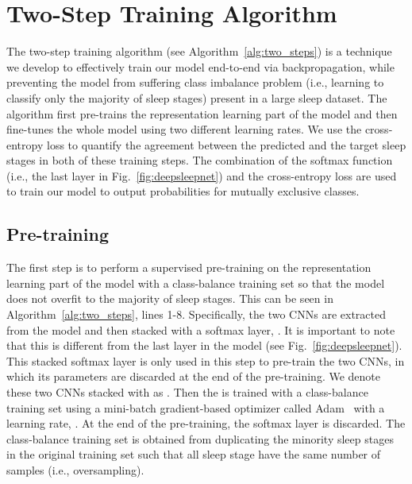 \documentclass[journal,twoside]{IEEEtran}
\begin{document}
\section{Two-Step Training Algorithm} \label{sec:two_steps}
The two-step training algorithm (see Algorithm~\ref{alg:two_steps}) is a technique we develop to effectively train our model end-to-end via backpropagation, while preventing the model from suffering class imbalance problem (i.e., learning to classify only the majority of sleep stages) present in a large sleep dataset. The algorithm first pre-trains the representation learning part of the model and then fine-tunes the whole model using two different learning rates. We use the cross-entropy loss to quantify the agreement between the predicted and the target sleep stages in both of these training steps. The combination of the softmax function (i.e., the last layer in Fig.~\ref{fig:deepsleepnet}) and the cross-entropy loss are used to train our model to output probabilities for mutually exclusive classes.

\subsection{Pre-training} \label{sec:two_steps_pretrain}
The first step is to perform a supervised pre-training on the representation learning part of the model with a class-balance training set so that the model does not overfit to the majority of sleep stages. This can be seen in Algorithm~\ref{alg:two_steps}, lines 1-8. Specifically, the two CNNs are extracted from the model and then stacked with a softmax layer, .
It is important to note that this  is different from the last layer in the model (see Fig.~\ref{fig:deepsleepnet}).
This stacked softmax layer is only used in this step to pre-train the two CNNs, in which its parameters are discarded at the end of the pre-training. We denote these two CNNs stacked with  as . Then the  is trained with a class-balance training set using a mini-batch gradient-based optimizer called Adam~\cite{kingma2014} with a learning rate, . At the end of the pre-training, the softmax layer is discarded. The class-balance training set is obtained from duplicating the minority sleep stages in the original training set such that all sleep stage have the same number of samples (i.e., oversampling).
\end{document}
